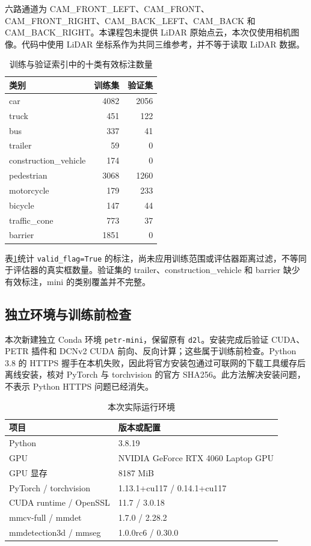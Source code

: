 \documentclass[UTF8,zihao=-4,fontset=windows]{ctexart}
\begin{document}
六路通道为 CAM\_FRONT\_LEFT、CAM\_FRONT、CAM\_FRONT\_RIGHT、CAM\_BACK\_LEFT、CAM\_BACK 和 CAM\_BACK\_RIGHT。本课程包未提供 LiDAR 原始点云，本次仅使用相机图像。代码中使用 LiDAR 坐标系作为共同三维参考，并不等于读取 LiDAR 数据。

\begin{table}[H]
\centering
\caption{训练与验证索引中的十类有效标注数量}
\label{tab:class-counts}
\begin{tabular}{lrr}
\toprule 类别 & 训练集 & 验证集 \\
\midrule
car & 4082 & 2056 \\
truck & 451 & 122 \\
bus & 337 & 41 \\
trailer & 59 & 0 \\
construction\_vehicle & 174 & 0 \\
pedestrian & 3068 & 1260 \\
motorcycle & 179 & 233 \\
bicycle & 147 & 44 \\
traffic\_cone & 773 & 37 \\
barrier & 1851 & 0 \\
\bottomrule
\end{tabular}
\end{table}

表\ref{tab:class-counts}统计 \texttt{valid\_flag=True} 的标注，尚未应用训练范围或评估器距离过滤，不等同于评估器的真实框数量。验证集的 trailer、construction\_vehicle 和 barrier 缺少有效标注，mini 的类别覆盖并不完整。

\subsection{独立环境与训练前检查}

本次新建独立 Conda 环境 \texttt{petr-mini}，保留原有 \texttt{d2l}。安装完成后验证 CUDA、PETR 插件和 DCNv2 CUDA 前向、反向计算；这些属于训练前检查。Python 3.8 的 HTTPS 握手在本机失败，因此将官方安装包通过可联网的下载工具缓存后离线安装，核对 PyTorch 与 torchvision 的官方 SHA256。此方法解决安装问题，不表示 Python HTTPS 问题已经消失。

\begin{table}[H]
\centering
\caption{本次实际运行环境}
\begin{tabularx}{\textwidth}{p{5.2cm}X}
\toprule 项目 & 版本或配置 \\
\midrule
Python & 3.8.19 \\
GPU & NVIDIA GeForce RTX 4060 Laptop GPU \\
GPU 显存 & 8187 MiB \\
PyTorch / torchvision & 1.13.1+cu117 / 0.14.1+cu117 \\
CUDA runtime / OpenSSL & 11.7 / 3.0.18 \\
mmcv-full / mmdet & 1.7.0 / 2.28.2 \\
mmdetection3d / mmseg & 1.0.0rc6 / 0.30.0 \\
\bottomrule
\end{tabularx}
\end{table}
\FloatBarrier
\end{document}
